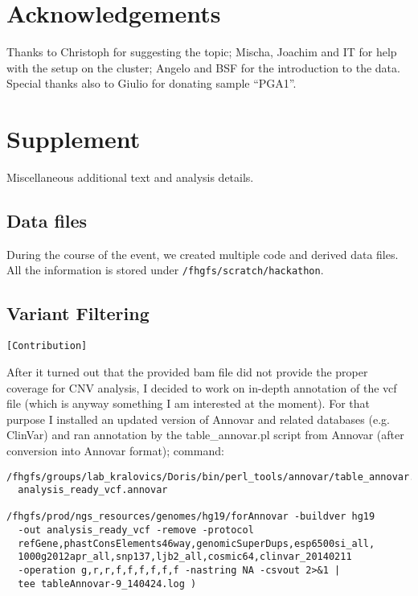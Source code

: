 \documentclass[a4paper,11pt]{TKnotes}
\begin{document}
\section{Acknowledgements}

Thanks to Christoph for suggesting the topic; Mischa, Joachim and IT for help with the setup on the cluster; Angelo and BSF for the introduction to the data. Special thanks also to Giulio for donating sample ``PGA1''.


\clearpage
\appendix
\section{Supplement}

Miscellaneous additional text and analysis details.

\subsection{Data files}

During the course of the event, we created multiple code and derived data files. All the information is stored under {\tt /fhgfs/scratch/hackathon}.

\subsection{Variant Filtering}

{\tt [Contribution]}

\vspace*{0.4cm}

\noindent After it turned out that the provided bam file did not provide the proper coverage for CNV analysis, I decided to work on in-depth annotation of the vcf file (which is anyway something I am interested at the moment). For that purpose I installed an updated version of Annovar and related databases (e.g. ClinVar) and ran annotation by the table\_annovar.pl script from Annovar (after conversion into Annovar format); command:

\begin{verbatim}
/fhgfs/groups/lab_kralovics/Doris/bin/perl_tools/annovar/table_annovar.pl 
  analysis_ready_vcf.annovar

/fhgfs/prod/ngs_resources/genomes/hg19/forAnnovar -buildver hg19 
  -out analysis_ready_vcf -remove -protocol 
  refGene,phastConsElements46way,genomicSuperDups,esp6500si_all,
  1000g2012apr_all,snp137,ljb2_all,cosmic64,clinvar_20140211 
  -operation g,r,r,f,f,f,f,f,f -nastring NA -csvout 2>&1 | 
  tee tableAnnovar-9_140424.log )
\end{verbatim}
 
\end{document}
